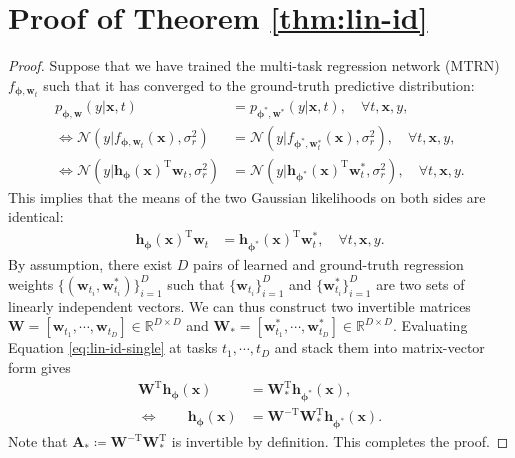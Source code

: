 \documentclass[nohyperref]{article}
\theoremstyle{plain}
\theoremstyle{definition}
\theoremstyle{remark}
\begin{document}




\newpage
\appendix
\onecolumn


\section{Proof of Theorem \ref{thm:lin-id}}\label{appendix:proof-lin-id}
\begin{proof}
    Suppose that we have trained the multi-task regression network (MTRN) $f_{\boldsymbol{\phi},\mathbf{w}_t}$ such that it has converged to the ground-truth predictive distribution:
    \begin{align}
        p_{\boldsymbol{\phi},\mathbf{w}}(y|\mathbf{x},t)&=p_{\boldsymbol{\phi}^*,\mathbf{w}^*}(y|\mathbf{x},t),\quad\forall t,\mathbf{x},y,\\
        \iff\mathcal{N}(y|f_{\boldsymbol{\phi},\mathbf{w}_t}(\mathbf{x}),\sigma_r^2) &= \mathcal{N}(y|f_{\boldsymbol{\phi}^*,\mathbf{w}_t^*}(\mathbf{x}),\sigma_r^2),\quad\forall t,\mathbf{x},y,\\
        \iff \mathcal{N}(y|\mathbf{h}_{\boldsymbol{\phi}}(\mathbf{x})^{\text{T}}\mathbf{w}_{t},\sigma_r^2) &= \mathcal{N}(y|\mathbf{h}_{\boldsymbol{\phi}^*}(\mathbf{x})^{\text{T}}\mathbf{w}_{t}^*,\sigma_r^2),\quad\forall t,\mathbf{x},y.
    \end{align}
    This implies that the means of the two Gaussian likelihoods on both sides are identical:
    \begin{align}
        \mathbf{h}_{\boldsymbol{\phi}}(\mathbf{x})^{\text{T}}\mathbf{w}_{t} &= \mathbf{h}_{\boldsymbol{\phi}^*}(\mathbf{x})^{\text{T}}\mathbf{w}_t^{*},\quad\forall t,\mathbf{x},y.\label{eq:lin-id-single}
    \end{align}
    By assumption, there exist $D$ pairs of learned and ground-truth regression weights $\{(\mathbf{w}_{t_i},\mathbf{w}_{t_i}^*)\}_{i=1}^D$ such that $\{\mathbf{w}_{t_i}\}_{i=1}^D$ and $\{\mathbf{w}_{t_i}^*\}_{i=1}^D$ are two sets of linearly independent vectors. We can thus construct two invertible matrices $\mathbf{W}=[\mathbf{w}_{t_1},\cdots,\mathbf{w}_{t_D}]\in\mathbb{R}^{D\times D}$ and $\mathbf{W}_{*}=[\mathbf{w}_{t_1}^*,\cdots,\mathbf{w}_{t_D}^*]\in\mathbb{R}^{D\times D}$. Evaluating Equation \eqref{eq:lin-id-single} at tasks $t_1,\cdots,t_D$ and stack them into matrix-vector form gives
    \begin{align}
        \mathbf{W}^{\text{T}}\mathbf{h}_{\boldsymbol{\phi}}(\mathbf{x})&=\mathbf{W}_{*}^{\text{T}}\mathbf{h}_{\boldsymbol{\phi}^*}(\mathbf{x}),\\
        \iff \quad\quad\mathbf{h}_{\boldsymbol{\phi}}(\mathbf{x})&=\mathbf{W}^{-\text{T}}\mathbf{W}_{*}^{\text{T}}\mathbf{h}_{\boldsymbol{\phi}^*}(\mathbf{x}).
    \end{align}
    Note that $\mathbf{A}_{*}\coloneqq\mathbf{W}^{-\text{T}}\mathbf{W}_{*}^{\text{T}}$ is invertible by definition. This completes the proof.
\end{proof}
\end{document}
